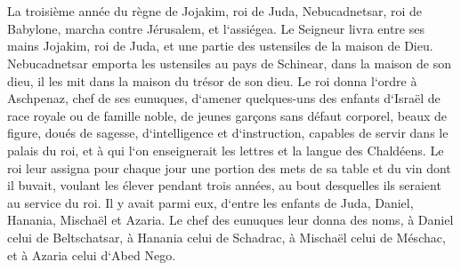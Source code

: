 

\chapter{}

\verse La troisième année du règne de Jojakim, roi de Juda, Nebucadnetsar, roi de Babylone, marcha contre Jérusalem, et l`assiégea. 
\verse Le Seigneur livra entre ses mains Jojakim, roi de Juda, et une partie des ustensiles de la maison de Dieu. Nebucadnetsar emporta les ustensiles au pays de Schinear, dans la maison de son dieu, il les mit dans la maison du trésor de son dieu. 
\verse Le roi donna l`ordre à Aschpenaz, chef de ses eunuques, d`amener quelques-uns des enfants d`Israël de race royale ou de famille noble, 
\verse de jeunes garçons sans défaut corporel, beaux de figure, doués de sagesse, d`intelligence et d`instruction, capables de servir dans le palais du roi, et à qui l`on enseignerait les lettres et la langue des Chaldéens. 
\verse Le roi leur assigna pour chaque jour une portion des mets de sa table et du vin dont il buvait, voulant les élever pendant trois années, au bout desquelles ils seraient au service du roi. 
\verse Il y avait parmi eux, d`entre les enfants de Juda, Daniel, Hanania, Mischaël et Azaria. 
\verse Le chef des eunuques leur donna des noms, à Daniel celui de Beltschatsar, à Hanania celui de Schadrac, à Mischaël celui de Méschac, et à Azaria celui d`Abed Nego. 
